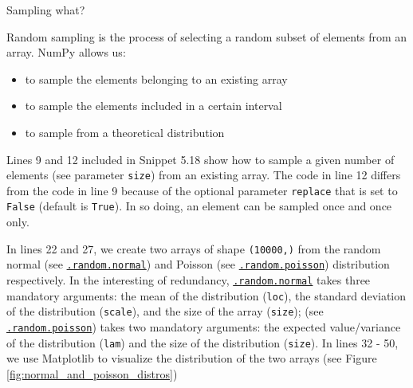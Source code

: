 \documentclass[a4paper,11pt]{book}
\newcommand{\question}[1]{%
    \begin{tcolorbox}[colback=comp_c!10,colframe=comp_c,sidebyside align=top,width=\linewidth,before skip=1ex]
        #1
    \end{tcolorbox}
    \switchcolumn%
}
\newcommand{\note}[1]{%
    \begin{tcolorbox}[colback=white!0,colframe=white!10,width=\linewidth,before skip=1ex]
        #1
    \end{tcolorbox}
}
\begin{document}
\begin{paracol}{2}
	\question{\raggedright Sampling what?}
	\note{Random sampling is the process of selecting a random subset of elements from an array. NumPy allows us:
	\begin{itemize}
		\item to sample the elements belonging to an existing array
		\item to sample the elements included in a certain interval
		\item to sample from a theoretical distribution
	\end{itemize}
	
	\quad Lines 9 and 12 included in Snippet 5.18 show how to sample a given number of elements (see parameter \texttt{size}) from an existing array. The code in line 12 differs from the code in line 9 because of the optional parameter \texttt{replace} that is set to \texttt{False} (default is \texttt{True}). In so doing, an element can be sampled once and once only.
	
	\quad In lines 22 and 27, we create two arrays of shape \texttt{(10000,)} from the random normal (see \href{https://numpy.org/doc/stable/reference/random/generated/numpy.random.Generator.normal.html}{\texttt{.random.normal}}) and Poisson (see \href{https://numpy.org/doc/stable/reference/random/generated/numpy.random.Generator.poisson.html}{\texttt{.random.poisson}}) distribution respectively. In the interesting of redundancy, \href{https://numpy.org/doc/stable/reference/random/generated/numpy.random.Generator.normal.html}{\texttt{.random.normal}} takes three mandatory arguments: the mean of the distribution (\texttt{loc}), the standard deviation of the distribution (\texttt{scale}), and the size of the array (\texttt{size}); (see \href{https://numpy.org/doc/stable/reference/random/generated/numpy.random.Generator.poisson.html}{\texttt{.random.poisson}}) takes two mandatory arguments: the expected value/variance of the distribution (\texttt{lam}) and the size of the distribution (\texttt{size}). In lines 32 - 50, we use Matplotlib to visualize the distribution of the two arrays (see Figure \ref{fig:normal_and_poisson_distros}) 
	}
\end{paracol}
\end{document}
